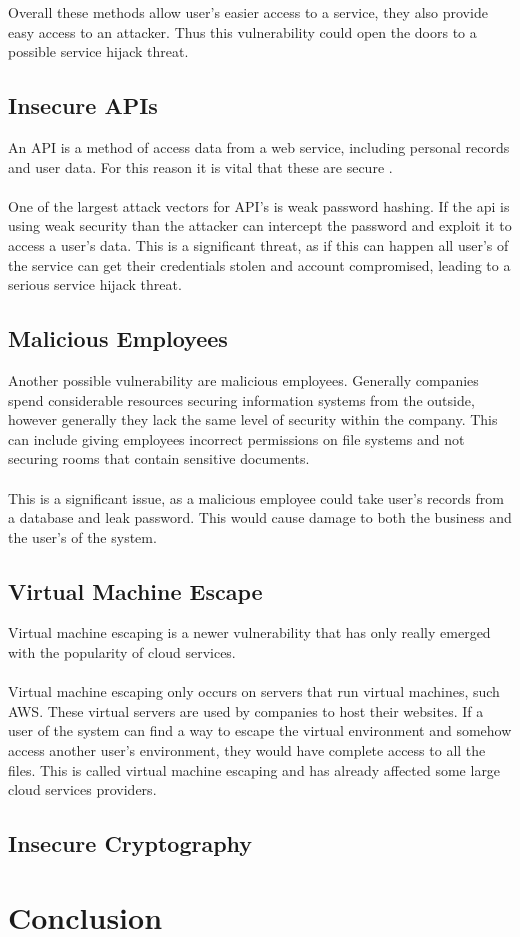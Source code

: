 Overall these methods allow user's easier access to a service, they also provide easy access to an attacker. Thus this vulnerability could open the doors to a possible service hijack threat.

\subsection{Insecure APIs}
An API is a method of access data from a web service, including personal records and user data. For this reason it is vital that these are secure \cite{lu_keeping_2014}.\\
\\
One of the largest attack vectors for API's is weak password hashing. If the api is using weak security than the attacker can intercept the password and exploit it to access a user's data. This is a significant threat, as if this can happen all user's of the service can get their credentials stolen and account compromised, leading to a serious service hijack threat.

\subsection{Malicious Employees}

Another possible vulnerability are malicious employees. Generally companies spend considerable resources securing information systems from the outside, however generally they lack the same level of security within the company. This can include giving employees incorrect permissions on file systems and not securing rooms that contain sensitive documents.\\
\\
This is a significant issue, as a malicious employee could take user's records from a database and leak password. This would cause damage to both the business and the user's of the system.

\subsection{Virtual Machine Escape}

Virtual machine escaping is a newer vulnerability that has only really emerged with the popularity of cloud services\cite{ramachandran_recommendations_2014}.\\
\\
Virtual machine escaping only occurs on servers that run virtual machines, such AWS\cite{aws_amazon_2016}. These virtual servers are used by companies to host their websites. If a user of the system can find a way to escape the virtual environment and somehow access another user's environment, they would have complete access to all the files. This is called virtual machine escaping and has already affected some large cloud services providers\cite{cloudstrike_venom_2016}.

\subsection{Insecure Cryptography}

\section{Conclusion}
